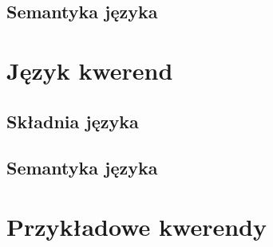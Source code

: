 \documentclass[11pt,a4paper]{article}
\begin{document}
\subsection{Semantyka języka}

\section{Język kwerend}

\subsection{Składnia języka}

\subsection{Semantyka języka}

\section{Przykładowe kwerendy}
\end{document}
